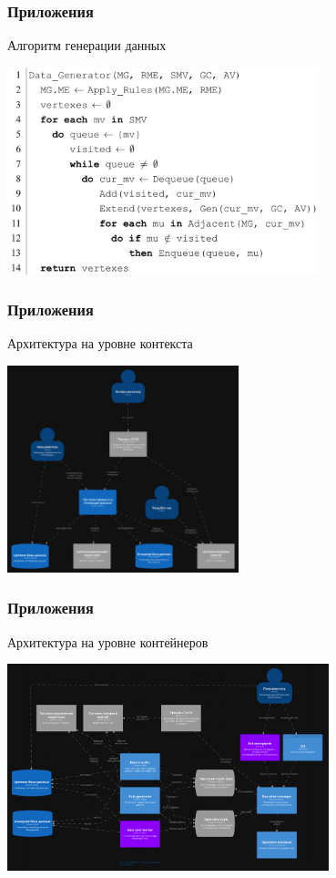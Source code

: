 \documentclass[pdf, hyperref={unicode}, aspectratio=169]{beamer}
\begin{document}
\begin{frame}
\frametitle{Приложения}
	Алгоритм генерации данных

	\begin{center}
		\includegraphics[height = 6cm]{img/extra-alg-generator}
	\end{center}
\end{frame}


\begin{frame}
\frametitle{Приложения}
	Архитектура на уровне контекста

	\begin{center}
		\includegraphics[height = 6cm]{img/structurizr-SystemLandscape}
	\end{center}
\end{frame}


\begin{frame}
\frametitle{Приложения}
	Архитектура на уровне контейнеров

	\begin{center}
		\includegraphics[height = 6cm]{img/structurizr-Containers}
	\end{center}
\end{frame}
\end{document}

